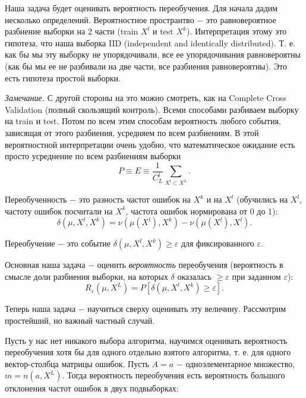 Наша задача будет оценивать вероятность переобучения. Для начала дадим несколько определений.
Вероятностное пространтво $-$ это равновероятное разбиение выборки на 2 части (train $X^l$ и test $X^k$). Интерпретация этому это гипотеза, что наша выборка IID (independent and identically distributed). Т. е. как бы мы эту выборку не упорядочивали, все ее упорядочивания равновероятны (как бы мы ее не разбивали на две части, все разбиения равновероятны). Это есть гипотеза простой выборки.

\textit{Замечание.} С другой стороны на это можно смотреть, как на Complete Cross Validation (полный скользящий контроль). Всеми способами разбиваем выборку на train и test. Потом по всем этим способам вероятность любого события, зависящая от этого разбиения, усредняем по всем разбиениям. В этой вероятностной интерпретации очень удобно, что математическое ожидание есть просто усреднение по всем разбиениям выборки
\begin{equation*}
    P \equiv E \equiv \frac{1}{C_L^l} \sum_{X^l \subset X^L}.
\end{equation*}

Переобученность $-$ это разность частот ошибок на $X^k$ и на $X^l$ (обучились на $X^l$, частоту ошибок посчитали на $X^k$, частота ошибок нормирована от 0 до 1):
\begin{equation*}
    \delta (\mu, X^l, X^k)=\nu (\mu(X^l), X^k ) - \nu(\mu(X^l), X^l ).
\end{equation*}

Переобучение $-$ это событие $\delta (\mu, X^l, X^k) \geq \varepsilon$ для фиксированного $\varepsilon$.

Основная наша задача $-$ оценить \textit{вероятность} переобучения (вероятность в смысле доли разбиения выборки, на которых $\delta$ оказалась $\geq \varepsilon$ при заданном $\varepsilon$):
\begin{equation*}
    R_{\varepsilon}(\mu, X^L) = P [\delta(\mu, X^l, X^k) \geq \varepsilon].
\end{equation*}

Теперь наша задача $-$ научиться сверху оценивать эту величину. Рассмотрим простейший, но важный частный случай.

Пусть у нас нет никакого выбора алгоритма, научимся оценивать вероятность переобучения хотя бы для одного отдельно взятого алгоритма, т. е. для одного вектор-столбца матрицы ошибок.
Пусть $A = {a}$ $-$ одноэлементарное множество, $m=n(a, X^L)$. Тогда вероятность переобучения есть вероятность большого отклонения частот ошибок в двух подвыборках:

